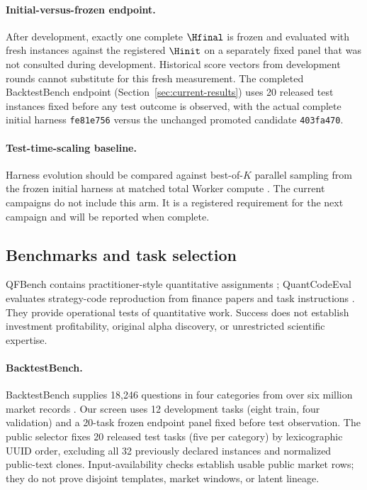 \paragraph{Initial-versus-frozen endpoint.}
After development, exactly one complete \(\Hfinal\) is frozen and evaluated
with fresh \Worker{} instances against the registered \(\Hinit\) on a
separately fixed panel that was not consulted during development.  Historical
score vectors from development rounds cannot substitute for this fresh
measurement.  The completed BacktestBench endpoint (Section~\ref{sec:current-results})
uses 20 released test instances fixed before any test outcome is observed,
with the actual complete initial harness \texttt{fe81e756} versus the unchanged
promoted candidate \texttt{403fa470}.

\paragraph{Test-time-scaling baseline.}
Harness evolution should be compared against best-of-\(K\) parallel sampling
from the frozen initial harness at matched total Worker compute
\citep{rethinking2026harness}.  The current campaigns do not include this
arm.  It is a registered requirement for the next campaign and will be
reported when complete.

\subsection{Benchmarks and task selection}

QFBench contains practitioner-style quantitative assignments
\citep{qfbench2026}; QuantCodeEval evaluates strategy-code reproduction from
finance papers and task instructions \citep{quantcodeeval2026}.  They provide
operational tests of quantitative work.  Success does not establish investment
profitability, original alpha discovery, or unrestricted scientific expertise.

\paragraph{BacktestBench.}
BacktestBench supplies 18{,}246 questions in four categories from over six
million market records \citep{wang2026backtestbench}.  Our screen uses
12 development tasks (eight train, four validation) and a 20-task frozen
endpoint panel fixed before test observation.  The public selector fixes
20 released test tasks (five per category) by lexicographic UUID order,
excluding all 32 previously declared instances and normalized public-text
clones.  Input-availability checks establish usable public market rows;
they do not prove disjoint templates, market windows, or latent lineage.

